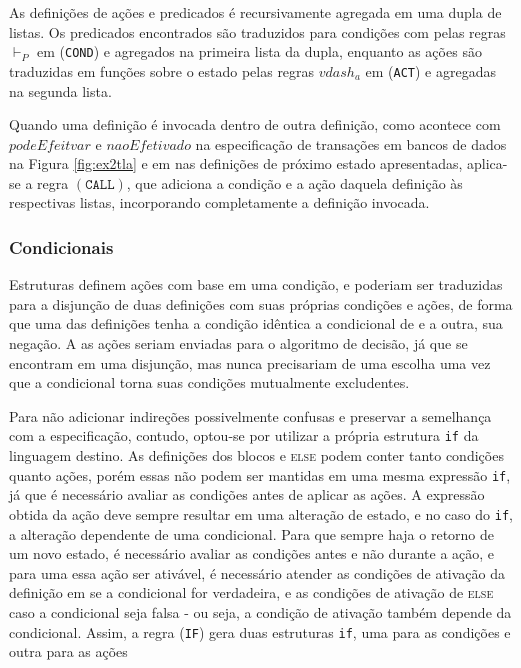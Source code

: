 As definições de ações e predicados é recursivamente agregada em uma dupla de
listas. Os predicados encontrados são traduzidos para condições com pelas regras
$\vdash_P$ em (\texttt{COND}) e agregados na primeira lista da dupla, enquanto as ações são
traduzidas em funções sobre o estado pelas regras $vdash_a$ em (\texttt{ACT}) e agregadas na
segunda lista.

Quando uma definição é invocada dentro de outra definição, como acontece com
$podeEfeitvar$ e $naoEfetivado$ na especificação de transações em bancos de
dados na Figura \ref{fig:ex2tla} e em nas definições de próximo estado apresentadas, aplica-se a regra
$(\texttt{CALL})$, que adiciona a condição e a ação daquela definição às
respectivas listas, incorporando completamente a definição invocada.



\subsubsection{Condicionais}

Estruturas \IF definem ações com base em uma condição, e poderiam ser traduzidas
para a disjunção de duas definições com suas próprias condições e ações, de forma que uma das
definições tenha a condição idêntica a condicional de \IF e a outra, sua
negação. A as ações seriam enviadas para o algoritmo de decisão, já que se
encontram em uma disjunção, mas nunca precisariam de uma escolha uma vez que a
condicional torna suas condições mutualmente excludentes.

Para não adicionar
indireções possivelmente confusas e preservar a semelhança com a especificação, contudo, optou-se por utilizar
a própria estrutura \texttt{if} da linguagem destino. As definições dos blocos
\IF e \textsc{else} podem conter tanto condições quanto ações, porém essas não
podem ser mantidas em uma mesma expressão \texttt{if}, já que é necessário
avaliar as condições antes de aplicar as ações. A expressão obtida da ação deve
sempre resultar em uma alteração de estado, e no caso do \texttt{if}, a alteração
dependente de uma condicional. Para que sempre haja o retorno de um novo estado, é necessário avaliar as
condições antes e não durante a ação, e para uma essa ação \IF ser ativável, é necessário
atender as condições de ativação da definição em
\THEN se a condicional for verdadeira, e as condições de ativação de \textsc{else} caso
a condicional seja falsa - ou seja, a condição de ativação também depende da
condicional. Assim, a regra (\texttt{IF}) gera duas estruturas \texttt{if}, uma
para as condições e outra para as ações

